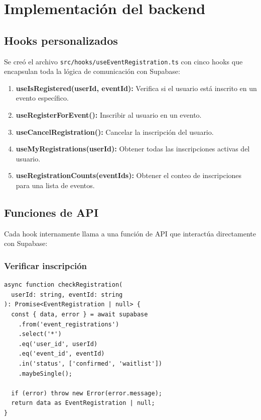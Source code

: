 
\section{Implementaci\'on del backend}

\subsection{Hooks personalizados}

Se cre\'o el archivo \texttt{src/hooks/useEventRegistration.ts} con
cinco hooks que encapsulan toda la l\'ogica de comunicaci\'on con
Supabase:

\begin{enumerate}
  \item \textbf{useIsRegistered(userId, eventId):} Verifica si el
    usuario est\'a inscrito en un evento espec\'ifico.
  \item \textbf{useRegisterForEvent():} Inscribir al usuario en un
    evento.
  \item \textbf{useCancelRegistration():} Cancelar la inscripci\'on
    del usuario.
  \item \textbf{useMyRegistrations(userId):} Obtener todas las
    inscripciones activas del usuario.
  \item \textbf{useRegistrationCounts(eventIds):} Obtener el conteo
    de inscripciones para una lista de eventos.
\end{enumerate}

\subsection{Funciones de API}

Cada hook internamente llama a una funci\'on de API que interact\'ua
directamente con Supabase:

\subsubsection*{Verificar inscripci\'on}

\begin{verbatim}
async function checkRegistration(
  userId: string, eventId: string
): Promise<EventRegistration | null> {
  const { data, error } = await supabase
    .from('event_registrations')
    .select('*')
    .eq('user_id', userId)
    .eq('event_id', eventId)
    .in('status', ['confirmed', 'waitlist'])
    .maybeSingle();

  if (error) throw new Error(error.message);
  return data as EventRegistration | null;
}
\end{verbatim}

